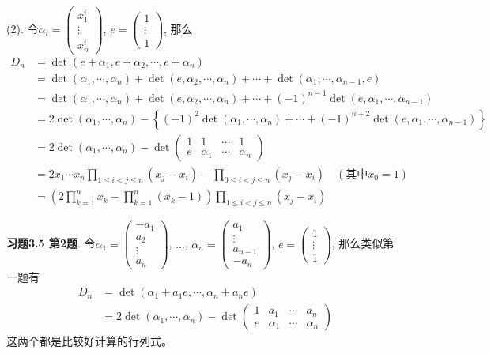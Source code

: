 (2). 令$\alpha_i = \begin{pmatrix} x_1^i \\ \vdots \\ x_n^i \end{pmatrix}$, $e = \begin{pmatrix} 1 \\ \vdots \\ 1 \end{pmatrix}$, 那么
\begin{align*}
D_n & = \det (e+\alpha_1, e+\alpha_2, \cdots, e+\alpha_n) \\
& = \det(\alpha_1, \cdots, \alpha_n) + \det(e, \alpha_2, \cdots, \alpha_n) + \cdots + \det(\alpha_1, \cdots, \alpha_{n-1}, e) \\
& = \det(\alpha_1, \cdots, \alpha_n) + \det(e, \alpha_2, \cdots, \alpha_n) + \cdots + (-1)^{n-1}\det(e, \alpha_1, \cdots, \alpha_{n-1}) \\
& = 2\det(\alpha_1, \cdots, \alpha_n) - \left\{(-1)^2\det(\alpha_1, \cdots, \alpha_n) + \cdots + (-1)^{n+2} \det(e, \alpha_1, \cdots, \alpha_{n-1})\right\} \\
& = 2\det(\alpha_1, \cdots, \alpha_n) - \det\begin{pmatrix} 1 & 1 & \cdots & 1 \\ e & \alpha_1 & \cdots & \alpha_n \end{pmatrix} \\
& = 2x_1\cdots x_n \prod_{1\leqslant i<j \leqslant n} (x_j-x_i) - \prod_{0\leqslant i<j \leqslant n} (x_j-x_i) \quad (\text{其中$x_0=1$}) \\
& = \left( 2\prod_{k=1}^n x_k - \prod_{k=1}^n(x_k-1) \right) \prod_{1\leqslant i<j \leqslant n} (x_j-x_i)
\end{align*}

\newpageorvspace

{\bf 习题3.5 第2题}. 令$\alpha_1 = \begin{pmatrix} -a_1 \\ a_2 \\ \vdots \\ a_n \end{pmatrix}$, $\ldots$, $\alpha_n = \begin{pmatrix} a_1 \\ \vdots \\ a_{n-1} \\ -a_n \end{pmatrix}$, $e = \begin{pmatrix} 1 \\ \vdots \\ 1 \end{pmatrix}$, 那么类似第一题有
\begin{align*}
D_n & = \det(\alpha_1 + a_1e, \cdots, \alpha_n + a_ne) \\
& = 2\det(\alpha_1, \cdots, \alpha_n) - \det\begin{pmatrix} 1 & a_1 & \cdots & a_n \\ e & \alpha_1 & \cdots & \alpha_n \end{pmatrix}
\end{align*}
这两个都是比较好计算的行列式。



